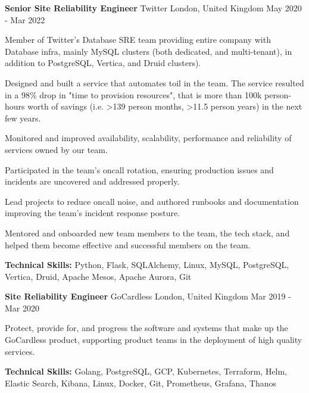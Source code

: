 \begin{cventries}
	\cventry
	{\textbf{Senior Site Reliability Engineer}} %
	{Twitter} %
	{London, United Kingdom} %
	{May 2020 - Mar 2022} %
	{
		\begin{cvitems} %
			\item {Member of Twitter's Database SRE team providing entire company with Database infra, mainly MySQL clusters
			            (both dedicated, and multi-tenant), in addition to PostgreSQL, Vertica, and Druid clusters).}
			\item {Designed and built a service that automates toil in the team. The service resulted in a 98\% drop in "time
			            to provision resources", that is more than 100k person-hours worth of savings (i.e. >139 person
			            months, >11.5 person years) in the next few years.}
			\item {Monitored and improved availability, scalability, performance and reliability of services owned by our
			            team.}
			\item {Participated in the team's oncall rotation, ensuring production issues and incidents are uncovered and
			            addressed properly.}
			\item {Lead projects to reduce oncall noise, and authored runbooks and documentation improving the team's incident
			            response posture.}
			\item {Mentored and onboarded new team members to the team, the tech stack, and helped them become effective and
			            successful members on the team.}
			\item {\textbf{Technical Skills:} Python, Flask, SQLAlchemy, Linux, MySQL, PostgreSQL, Vertica, Druid, Apache
			            Mesos, Apache Aurora, Git}
		\end{cvitems}
	}

	\cventry
	{\textbf{Site Reliability Engineer}} %
	{GoCardless} %
	{London, United Kingdom} %
	{Mar 2019 - Mar 2020} %
	{
		\begin{cvitems} %
			\item {Protect, provide for, and progress the software and systems that make up the GoCardless product, supporting
			            product teams in the deployment of high quality services.}
			\item {\textbf{Technical Skills:} Golang, PostgreSQL, GCP, Kubernetes, Terraform, Helm, Elastic Search, Kibana,
			            Linux, Docker, Git, Prometheus, Grafana, Thanos}
		\end{cvitems}
	}


\end{cventries}
